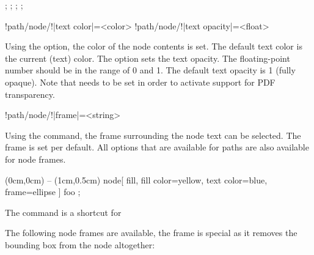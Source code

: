 \documentclass[a4paper]{article}
\begin{document}
{{\begin{codeexamplecolumns}
\begin{qdraw}
   ;
   ;
   ;
   ;
\end{qdraw}
\end{codeexamplecolumns}

\begin{macrodef}
!path/node/!|text color|={<color>}
!path/node/!|text opacity|={<float>}
\end{macrodef}
Using the  option, the color of the node contents is set. The default text color is the current (text) color. The option  sets the text opacity. The floating-point number should be in the range of \num{0} and \num{1}. The default text opacity is \num{1} (fully opaque). Note that \macro{\DocumentMetadata{}} needs to be set in order to activate support for PDF transparency.

\begin{macrodef}
!path/node/!|frame|={<string>}
\end{macrodef}
Using the  command, the frame surrounding the node text can be selected. The frame  is set per default. All options that are available for paths are also available for node frames.

\begin{codeexamplecolumns}
\begin{qdraw}
  \stroke (0cm,0cm) -- (1cm,0.5cm)
    node[
      fill, fill color={yellow},
      text color={blue},
      frame={ellipse}
    ] {foo} ;
\end{qdraw}
\end{codeexamplecolumns}

The command \macro{\node} is a shortcut for 

The following node frames are available, the frame  is special as it removes the bounding box from the node altogether:


}}
\end{document}
